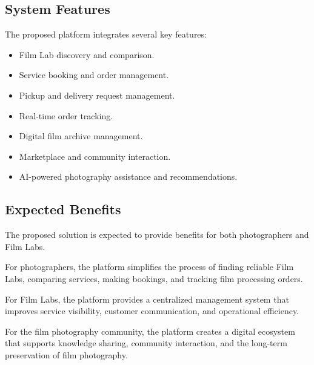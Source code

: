 \subsection{System Features}

The proposed platform integrates several key features:

\begin{itemize}
    \item Film Lab discovery and comparison.
    \item Service booking and order management.
    \item Pickup and delivery request management.
    \item Real-time order tracking.
    \item Digital film archive management.
    \item Marketplace and community interaction.
    \item AI-powered photography assistance and recommendations.
\end{itemize}

\subsection{Expected Benefits}

The proposed solution is expected to provide benefits for both photographers and Film Labs.

For photographers, the platform simplifies the process of finding reliable Film Labs, comparing services, making bookings, and tracking film processing orders.

For Film Labs, the platform provides a centralized management system that improves service visibility, customer communication, and operational efficiency.

For the film photography community, the platform creates a digital ecosystem that supports knowledge sharing, community interaction, and the long-term preservation of film photography.